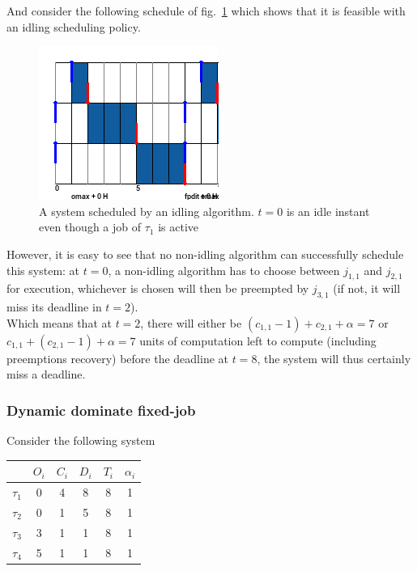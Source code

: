 \documentclass[a4paper,10pt]{article}
\begin{document}
        And consider the following schedule of fig.~\ref{fig:mustidle_pallf} which shows that it is feasible with an idling scheduling policy.

        \begin{figure}[H]
        \begin{center}
            \includegraphics[scale=0.7]{figs/mustIdle_PALLF.png}
            \caption{A system scheduled by an idling algorithm. $t=0$ is an idle instant even though a job of $\tau_1$ is active}
            \label{fig:mustidle_pallf}
        \end{center}
        \end{figure}

        However, it is easy to see that no non-idling algorithm can successfully schedule this system: at $t=0$, a non-idling algorithm has to choose between $j_{1,1}$ and $j_{2,1}$ for execution, whichever is chosen will then be preempted by $j_{3,1}$ (if not, it will miss its deadline in $t=2$).\\

        Which means that at $t=2$, there will either be \mbox{$(c_{1,1} - 1) +c_{2,1} + \alpha = 7$} or \mbox{$c_{1,1} + (c_{2,1} -1) + \alpha = 7$} units of computation left to compute (including preemptions recovery) before the deadline at $t=8$, the system will thus certainly miss a deadline.


        \subsubsection{Dynamic dominate fixed-job}

        Consider the following system

        \begin{center}
            \begin{tabular}{|r|c|c|c|c|c|}
                \hline
                            & $O_i$ & $C_i$ & $D_i$ & $T_i$ & $\alpha_i$ \\ \hline
                $\tau_1$    & 0     & 4     & 8    & 8     & 1     \\ \hline
                $\tau_2$    & 0     & 1     & 5    & 8     & 1     \\ \hline
                $\tau_3$    & 3     & 1     & 1    & 8     & 1     \\ \hline
                $\tau_4$    & 5     & 1     & 1    & 8     & 1     \\ \hline
            \end{tabular}
        \end{center}
\end{document}
